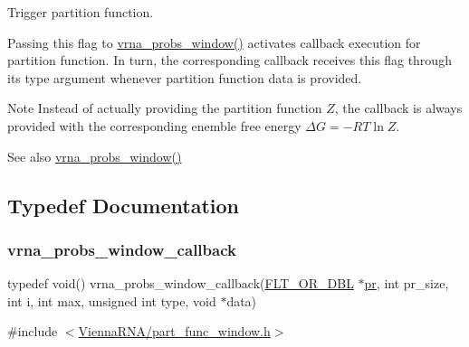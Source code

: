 Trigger partition function. 

Passing this flag to \mbox{\hyperlink{group__part__func__window_ga7115d012988541a65ec323c5f17a334b}{vrna\+\_\+probs\+\_\+window()}} activates callback execution for partition function. In turn, the corresponding callback receives this flag through it\textquotesingle{}s {\ttfamily type} argument whenever partition function data is provided.

\begin{DoxyNote}{Note}
Instead of actually providing the partition function $Z$, the callback is always provided with the corresponding enemble free energy $\Delta G = - RT \ln Z$.
\end{DoxyNote}
\begin{DoxySeeAlso}{See also}
\mbox{\hyperlink{group__part__func__window_ga7115d012988541a65ec323c5f17a334b}{vrna\+\_\+probs\+\_\+window()}} 
\end{DoxySeeAlso}


\subsection{Typedef Documentation}
\mbox{\label{group__part__func__window_gabe710a1182e6db69cc75329dfc9bed67}} 
\subsubsection{\texorpdfstring{vrna\_probs\_window\_callback}{vrna\_probs\_window\_callback}}
{\footnotesize\ttfamily typedef void() vrna\+\_\+probs\+\_\+window\+\_\+callback(\mbox{\hyperlink{group__data__structures_ga31125aeace516926bf7f251f759b6126}{F\+L\+T\+\_\+\+O\+R\+\_\+\+D\+BL}} $\ast$\mbox{\hyperlink{fold__vars_8h_ac98ec419070aee6831b44e5c700f090f}{pr}}, int pr\+\_\+size, int i, int max, unsigned int type, void $\ast$data)}



{\ttfamily \#include $<$\mbox{\hyperlink{part__func__window_8h}{Vienna\+R\+N\+A/part\+\_\+func\+\_\+window.\+h}}$>$}



